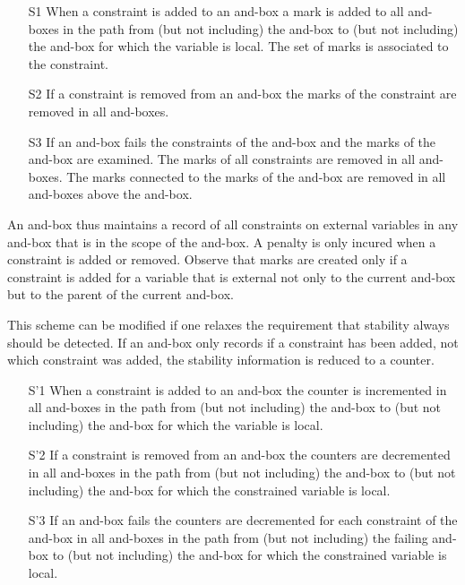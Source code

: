 \begin{itemize}

\item[S1] When a constraint is added to an and-box a mark is added to 
all and-boxes in the path from (but not including) the and-box to (but not
including) the and-box for which the variable is local. The set of marks
is associated to the constraint.

\item[S2] If a constraint is removed from an and-box the marks of the 
constraint are removed in all and-boxes.

\item[S3] If an and-box fails the constraints of the and-box and the 
marks of the and-box are examined. The marks of all constraints are
removed in all and-boxes. The marks connected to the marks of the
and-box are removed in all and-boxes above the and-box.

\end{itemize}

An and-box thus maintains a record of all constraints on external
variables in any and-box that is in the scope of the and-box. A
penalty is only incured when a constraint is added or removed. Observe that
marks are created only if a constraint is added for a variable that is
external not only to the current and-box but to the parent of the
current and-box.

This scheme can be modified if one relaxes the requirement that
stability always should be detected. If an and-box only records if a
constraint has been added, not which constraint was added, the
stability information is reduced to a counter.


\begin{itemize}

\item[S'1] When a constraint is added to an and-box the counter is 
incremented in all and-boxes in the path from (but not including) the
and-box to (but not including) the and-box for which the variable is
local.

\item[S'2] If a constraint is removed from an and-box the counters 
are decremented in all and-boxes in the path from (but not including) the
and-box to (but not including) the and-box for which the constrained
variable is local.

\item[S'3] If an and-box fails the counters are decremented for each 
constraint of the and-box in all and-boxes in the path from (but not
including) the failing and-box to (but not including) the and-box for
which the constrained variable is local.

\end{itemize}

